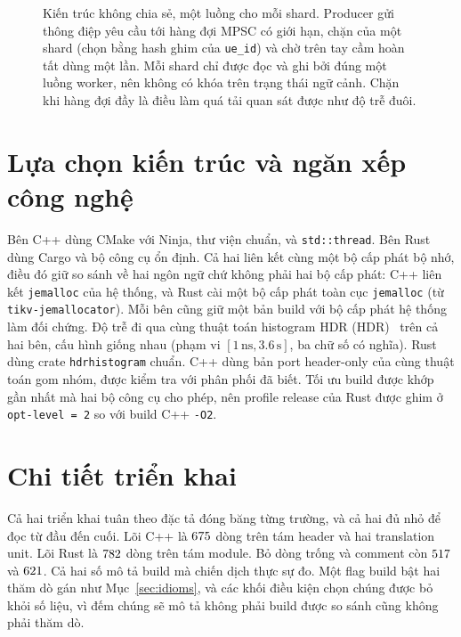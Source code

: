 \begin{figure}[ht]
\caption[Kiến trúc không chia sẻ, một luồng cho mỗi shard]{Kiến trúc không chia sẻ, một luồng cho mỗi shard. Producer gửi thông điệp yêu cầu tới
hàng đợi MPSC có giới hạn, chặn của một shard (chọn bằng hash ghim của \texttt{ue\_id}) và chờ
trên tay cầm hoàn tất dùng một lần. Mỗi shard chỉ được đọc và ghi bởi đúng một luồng worker,
nên không có khóa trên trạng thái ngữ cảnh. Chặn khi hàng đợi đầy là điều làm quá tải
quan sát được như độ trễ đuôi.\label{fig:arch}}
\end{figure}

\section{Lựa chọn kiến trúc và ngăn xếp công nghệ}
Bên C++ dùng CMake với Ninja, thư viện chuẩn, và \texttt{std::thread}. Bên
Rust dùng Cargo và bộ công cụ ổn định. Cả hai liên kết cùng một bộ cấp phát bộ nhớ, điều đó giữ
so sánh về hai ngôn ngữ chứ không phải hai bộ cấp phát: C++ liên kết
\texttt{jemalloc} của hệ thống, và Rust cài một bộ cấp phát toàn cục \texttt{jemalloc} (từ
\texttt{tikv-jemallocator}). Mỗi bên cũng giữ một bản build với bộ cấp phát hệ thống làm đối chứng.
Độ trễ đi qua cùng thuật toán histogram HDR (HDR)~\cite{tene_hdrhistogram} trên cả hai bên, cấu hình giống nhau (phạm vi
$[1\,\text{ns}, 3.6\,\text{s}]$, ba chữ số có nghĩa). Rust dùng crate
\texttt{hdrhistogram} chuẩn. C++ dùng bản port header-only của cùng thuật toán gom nhóm,
được kiểm tra với phân phối đã biết. Tối ưu build được khớp gần nhất mà hai
bộ công cụ cho phép, nên profile release của Rust được ghim ở \texttt{opt-level~=~2} so với
build C++ \texttt{-O2}.

\section{Chi tiết triển khai}\label{sec:impldetails}
\label{sec:impl}
Cả hai triển khai tuân theo đặc tả đóng băng từng trường, và cả hai đủ nhỏ
để đọc từ đầu đến cuối. Lõi C++ là $675$ dòng trên tám header và hai
translation unit. Lõi Rust là $782$ dòng trên tám module. Bỏ dòng trống
và comment còn $517$ và $621$. Cả hai số mô tả build mà
chiến dịch thực sự đo. Một flag build bật hai thăm dò gán như Mục~\ref{sec:idioms}, và các khối điều kiện chọn chúng được bỏ khỏi số liệu,
vì đếm chúng sẽ mô tả không phải build được so sánh cũng không phải thăm dò.

